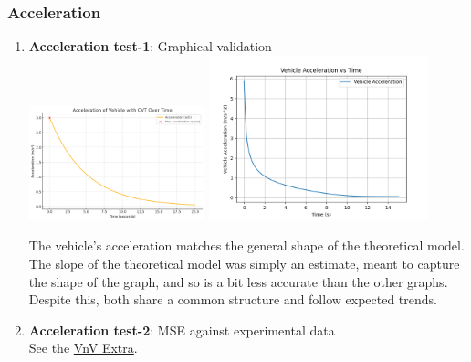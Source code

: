 \documentclass[12pt, titlepage]{article}
\begin{document}
\subsubsection{Acceleration}
\begin{enumerate}
\item{\textbf{Acceleration test-1}: Graphical validation}\\

\includegraphics[width=0.4\textwidth]{theoretical-figures/acceleration.png}
\includegraphics[width=0.5\textwidth]{simulation-figures/vehicle_acceleration.png}

The vehicle's acceleration matches the general shape of the theoretical model. The slope of the theoretical model was simply an estimate, meant to capture the shape of the graph, and so is a bit less accurate than the other graphs. Despite this, both share a common structure and follow expected trends.
\item{\textbf{Acceleration test-2}: MSE against experimental data}\\
See the \href{https://github.com/gr812b/CVT-Simulator/blob/develop/docs/VnVExtra/VnVExtra.pdf}{VnV Extra}.

\end{enumerate}
\end{document}
